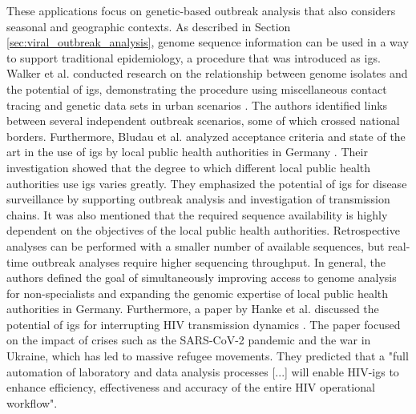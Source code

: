 These applications focus on genetic-based outbreak analysis that also considers seasonal and geographic contexts. As described in Section \ref{sec:viral_outbreak_analysis}, genome sequence information can be used in a way to support traditional epidemiology, a procedure that was introduced as \acrshort{igs}. Walker et al. conducted research on the relationship between genome isolates and the potential of \acrshort{igs}, demonstrating the procedure using miscellaneous contact tracing and genetic data sets in urban scenarios \cite{Wal1}. The authors identified links between several independent outbreak scenarios, some of which crossed national borders.
Furthermore, Bludau et al. analyzed acceptance criteria and state of the art in the use of \acrshort{igs} by local public health authorities in Germany \cite{Blu1}. Their investigation showed that the degree to which different local public health authorities use \acrshort{igs} varies greatly. They emphasized the potential of \acrshort{igs} for disease surveillance by supporting outbreak analysis and investigation of transmission chains. It was also mentioned that the required sequence availability is highly dependent on the objectives of the local public health authorities. Retrospective analyses can be performed with a smaller number of available sequences, but real-time outbreak analyses require higher sequencing throughput. In general, the authors defined the goal of simultaneously improving access to genome analysis for non-specialists and expanding the genomic expertise of local public health authorities in Germany.
Furthermore, a paper by Hanke et al. discussed the potential of \acrshort{igs} for interrupting HIV transmission dynamics \cite{Han1}. The paper focused on the impact of crises such as the SARS-CoV-2 pandemic and the war in Ukraine, which has led to massive refugee movements. They predicted that a "full automation of laboratory and data analysis processes [...] will enable HIV-\acrshort{igs} to enhance efficiency, effectiveness and accuracy of the entire HIV operational workflow".

